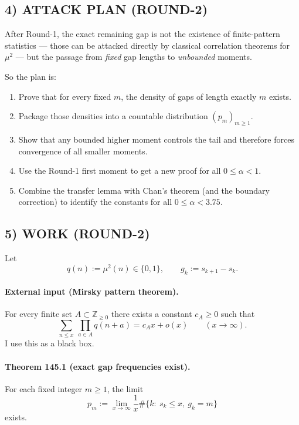 \subsection*{4) ATTACK PLAN (ROUND-2)}

After Round-1, the exact remaining gap is not the existence of finite-pattern statistics --- those can be
attacked directly by classical correlation theorems for $\mu^2$ --- but the passage from \emph{fixed}
gap lengths to \emph{unbounded} moments.

So the plan is:

\begin{enumerate}
\item Prove that for every fixed $m$, the density of gaps of length exactly $m$ exists.
\item Package those densities into a countable distribution $(p_m)_{m\ge 1}$.
\item Show that any bounded higher moment controls the tail and therefore forces convergence of all
smaller moments.
\item Use the Round-1 first moment to get a new proof for all $0\le \alpha<1$.
\item Combine the transfer lemma with Chan's theorem (and the boundary correction) to identify the
constants for all $0\le \alpha<3.75$.
\end{enumerate}

\subsection*{5) WORK (ROUND-2)}

Let
\[
q(n):=\mu^2(n)\in \{0,1\},
\qquad
g_k:=s_{k+1}-s_k.
\]

\paragraph{\textbf{External input (Mirsky pattern theorem).}}
For every finite set $A\subset \mathbb Z_{\ge 0}$ there exists a constant $c_A\ge 0$ such that
\[
\sum_{n\le x}\ \prod_{a\in A} q(n+a) = c_A x + o(x)
\qquad (x\to\infty).
\]
I use this as a black box.

\paragraph{\textbf{Theorem 145.1 (exact gap frequencies exist).}}
For each fixed integer $m\ge 1$, the limit
\[
p_m:=
\lim_{x\to\infty}
\frac1x\#\{k:\ s_k\le x,\ g_k=m\}
\]
exists.

